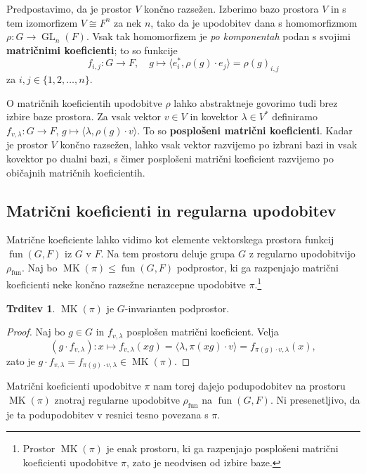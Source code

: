 \documentclass[11pt]{book}
\DeclareMathOperator\MK{MK}
\DeclareMathOperator\fun{fun}
\DeclareMathOperator\GL{GL}
\def\definicija{\color{rdeca}\bf}
\theoremstyle{definition}
\theoremstyle{zgled}
\theoremstyle{zgledbrezstevilke}
\theoremstyle{odprtproblem}
\theoremstyle{domacanaloga}
\newenvironment{dokaz}
    {\color{siva}\begin{proof}}
    {\end{proof}}
\theoremstyle{izrek}
\newtheorem{trditev}[theorem]{Trditev}
\begin{document}
Predpostavimo, da je prostor $V$ končno razsežen. Izberimo bazo prostora $V$ in s tem izomorfizem $V \cong F^n$ za nek $n$, tako da je upodobitev dana s homomorfizmom $\rho \colon G \to \GL_n(F)$. Vsak tak homomorfizem je \emph{po komponentah} podan s svojimi {\definicija matričnimi koeficienti}; to so funkcije
\[
    f_{i,j} \colon G \to F, \quad
    g \mapsto \langle e_i^*, \rho(g) \cdot e_j \rangle = \rho(g)_{i,j}
\]
za $i,j \in \{ 1, 2, \dots, n \}$. 

O matričnih koeficientih upodobitve $\rho$ lahko abstraktneje govorimo tudi brez izbire baze prostora. Za vsak vektor $v \in V$ in kovektor $\lambda \in V^*$ definiramo $f_{v, \lambda} \colon G \to F$, $g \mapsto \langle \lambda, \rho(g) \cdot v \rangle$. To so {\definicija posplošeni matrični koeficienti}. Kadar je prostor $V$ končno razsežen, lahko vsak vektor razvijemo po izbrani bazi in vsak kovektor po dualni bazi, s čimer posplošeni matrični koeficient razvijemo po običajnih matričnih koeficientih.

\subsection{Matrični koeficienti in regularna upodobitev}

Matrične koeficiente lahko vidimo kot elemente vektorskega prostora funkcij $\fun(G,F)$ iz $G$ v $F$. Na tem prostoru deluje grupa $G$ z regularno upodobitvijo $\rho_{\fun}$. Naj bo $\MK(\pi) \leq \fun(G,F)$ podprostor, ki ga razpenjajo matrični koeficienti neke končno razsežne nerazcepne upodobitve $\pi$.\footnote{Prostor $\MK(\pi)$ je enak prostoru, ki ga razpenjajo posplošeni matrični koeficienti upodobitve $\pi$, zato je neodvisen od izbire baze.}

\begin{trditev}
$\MK(\pi)$ je $G$-invarianten podprostor.
\end{trditev}
\begin{dokaz}
Naj bo $g \in G$ in $f_{v, \lambda}$ posplošen matrični koeficient. Velja
\[
    (g \cdot f_{v, \lambda}) \colon x \mapsto f_{v, \lambda}(xg) =
    \langle \lambda, \pi(xg) \cdot v \rangle =
    f_{\pi(g) \cdot v, \lambda}(x),
\]
zato je $g \cdot f_{v, \lambda} = f_{\pi(g) \cdot v, \lambda} \in \MK(\pi)$.
\end{dokaz}

Matrični koeficienti upodobitve $\pi$ nam torej dajejo podupodobitev na prostoru $\MK(\pi)$ znotraj regularne upodobitve $\rho_{\fun}$ na $\fun(G,F)$. Ni presenetljivo, da je ta podupodobitev v resnici tesno povezana s $\pi$.
\end{document}
